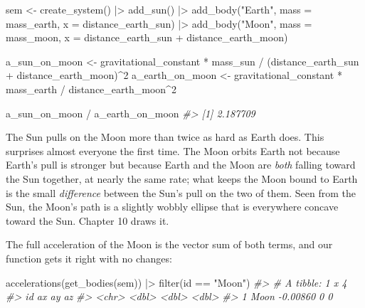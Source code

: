 \documentclass[
  10.5pt,
  letterpaper,
]{scrbook}
\newenvironment{Shaded}{\begin{snugshade}}{\end{snugshade}}
\newcommand{\AttributeTok}[1]{\textcolor[rgb]{0.00,0.00,0.00}{#1}}
\newcommand{\CommentTok}[1]{\textcolor[rgb]{0.00,0.00,0.00}{\textit{#1}}}
\newcommand{\DecValTok}[1]{\textcolor[rgb]{0.00,0.00,0.00}{#1}}
\newcommand{\FunctionTok}[1]{\textcolor[rgb]{0.00,0.00,0.00}{#1}}
\newcommand{\NormalTok}[1]{\textcolor[rgb]{0.00,0.00,0.00}{#1}}
\newcommand{\OtherTok}[1]{\textcolor[rgb]{0.00,0.00,0.00}{#1}}
\newcommand{\SpecialCharTok}[1]{\textcolor[rgb]{0.00,0.00,0.00}{#1}}
\newcommand{\StringTok}[1]{\textcolor[rgb]{0.00,0.00,0.00}{#1}}
\theoremstyle{plain}
\theoremstyle{remark}
\begin{document}
\begin{Shaded}
\begin{Highlighting}[]
\NormalTok{sem }\OtherTok{\textless{}{-}} \FunctionTok{create\_system}\NormalTok{() }\SpecialCharTok{|\textgreater{}}
  \FunctionTok{add\_sun}\NormalTok{() }\SpecialCharTok{|\textgreater{}}
  \FunctionTok{add\_body}\NormalTok{(}\StringTok{"Earth"}\NormalTok{, }\AttributeTok{mass =}\NormalTok{ mass\_earth, }\AttributeTok{x =}\NormalTok{ distance\_earth\_sun) }\SpecialCharTok{|\textgreater{}}
  \FunctionTok{add\_body}\NormalTok{(}\StringTok{"Moon"}\NormalTok{,  }\AttributeTok{mass =}\NormalTok{ mass\_moon,}
           \AttributeTok{x =}\NormalTok{ distance\_earth\_sun }\SpecialCharTok{+}\NormalTok{ distance\_earth\_moon)}

\NormalTok{a\_sun\_on\_moon   }\OtherTok{\textless{}{-}}\NormalTok{ gravitational\_constant }\SpecialCharTok{*}\NormalTok{ mass\_sun }\SpecialCharTok{/}
\NormalTok{                   (distance\_earth\_sun }\SpecialCharTok{+}\NormalTok{ distance\_earth\_moon)}\SpecialCharTok{\^{}}\DecValTok{2}
\NormalTok{a\_earth\_on\_moon }\OtherTok{\textless{}{-}}\NormalTok{ gravitational\_constant }\SpecialCharTok{*}\NormalTok{ mass\_earth }\SpecialCharTok{/}
\NormalTok{                   distance\_earth\_moon}\SpecialCharTok{\^{}}\DecValTok{2}

\NormalTok{a\_sun\_on\_moon }\SpecialCharTok{/}\NormalTok{ a\_earth\_on\_moon}
\CommentTok{\#\textgreater{} [1] 2.187709}
\end{Highlighting}
\end{Shaded}

The Sun pulls on the Moon more than twice as hard as Earth does. This
surprises almost everyone the first time. The Moon orbits Earth not
because Earth's pull is stronger but because Earth and the Moon are
\emph{both} falling toward the Sun together, at nearly the same rate;
what keeps the Moon bound to Earth is the small \emph{difference}
between the Sun's pull on the two of them. Seen from the Sun, the Moon's
path is a slightly wobbly ellipse that is everywhere concave toward the
Sun. Chapter 10 draws it.

The full acceleration of the Moon is the vector sum of both terms, and
our function gets it right with no changes:

\begin{Shaded}
\begin{Highlighting}[]
\FunctionTok{accelerations}\NormalTok{(}\FunctionTok{get\_bodies}\NormalTok{(sem)) }\SpecialCharTok{|\textgreater{}}
  \FunctionTok{filter}\NormalTok{(id }\SpecialCharTok{==} \StringTok{"Moon"}\NormalTok{)}
\CommentTok{\#\textgreater{} \# A tibble: 1 x 4}
\CommentTok{\#\textgreater{}   id          ax    ay    az}
\CommentTok{\#\textgreater{}   \textless{}chr\textgreater{}    \textless{}dbl\textgreater{} \textless{}dbl\textgreater{} \textless{}dbl\textgreater{}}
\CommentTok{\#\textgreater{} 1 Moon  {-}0.00860     0     0}
\end{Highlighting}
\end{Shaded}
\end{document}
